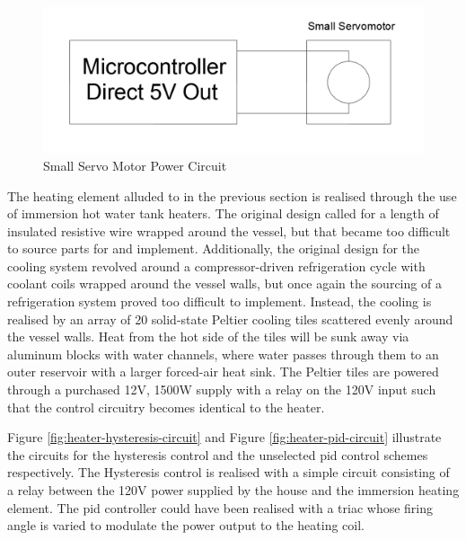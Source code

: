 \documentclass{article}
\begin{document}
\begin{figure}[H]
\begin{center}
\includegraphics[scale=0.30]{servo-small-actuator-circuit.png}
\caption{Small Servo Motor Power Circuit}
\label{fig:servo-small-actuator-circuit}
\end{center}
\end{figure}

\noindent The heating element alluded to in the previous section is realised through the use of immersion hot water tank heaters. The original design called for a length of insulated resistive wire wrapped around the vessel, but that became too difficult to source parts for and implement. Additionally, the original design for the cooling system revolved around a compressor-driven refrigeration cycle with coolant coils wrapped around the vessel walls, but once again the sourcing of a refrigeration system proved too difficult to implement. Instead, the cooling is realised by an array of 20 solid-state Peltier cooling tiles scattered evenly around the vessel walls. Heat from the hot side of the tiles will be sunk away via aluminum blocks with water channels, where water passes through them to an outer reservoir with a larger forced-air heat sink. The Peltier tiles are powered through a purchased 12V, 1500W supply with a relay on the 120V input such that the control circuitry becomes identical to the heater.

\noindent Figure \ref{fig:heater-hysteresis-circuit} and Figure \ref{fig:heater-pid-circuit} illustrate the circuits for the hysteresis control and the unselected \gls{pid} control schemes respectively. The Hysteresis control is realised with a simple circuit consisting of a relay between the 120V power supplied by the house and the immersion heating element. The \gls{pid} controller could have been realised with a triac whose firing angle is varied to modulate the power output to the heating coil.
\end{document}
